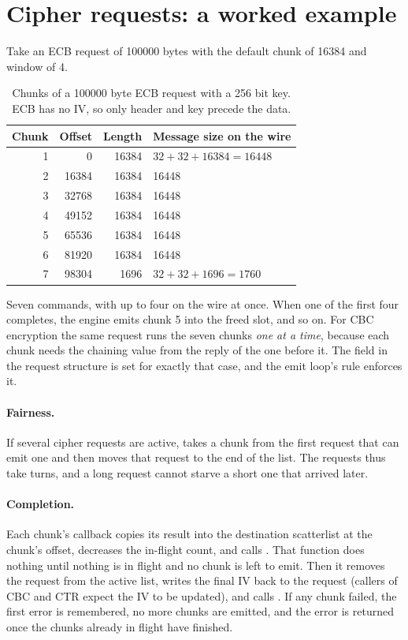 \section{Cipher requests: a worked example}

Take an ECB request of 100000 bytes with the default chunk of 16384 and window of 4.

\begin{table}[ht]
\centering
\begin{tabular}{rrrl}
\toprule
Chunk & Offset & Length & Message size on the wire \\
\midrule
1 & 0 & 16384 & $32 + 32 + 16384 = 16448$ \\
2 & 16384 & 16384 & 16448 \\
3 & 32768 & 16384 & 16448 \\
4 & 49152 & 16384 & 16448 \\
5 & 65536 & 16384 & 16448 \\
6 & 81920 & 16384 & 16448 \\
7 & 98304 & 1696 & $32 + 32 + 1696 = 1760$ \\
\bottomrule
\end{tabular}
\caption{Chunks of a 100000 byte ECB request with a 256 bit key. ECB has no IV, so only header and key precede the data.}
\end{table}

Seven commands, with up to four on the wire at once. When one of the first four completes, the engine emits chunk 5 into the freed slot, and so on. For CBC encryption the same request runs the seven chunks \emph{one at a time}, because each chunk needs the chaining value from the reply of the one before it. The field  in the request structure is set for exactly that case, and the emit loop's rule  enforces it.

\paragraph{Fairness.} If several cipher requests are active,  takes a chunk from the first request that can emit one and then moves that request to the end of the list. The requests thus take turns, and a long request cannot starve a short one that arrived later.

\paragraph{Completion.} Each chunk's callback copies its result into the destination scatterlist at the chunk's offset, decreases the in-flight count, and calls . That function does nothing until nothing is in flight and no chunk is left to emit. Then it removes the request from the active list, writes the final IV back to the request (callers of CBC and CTR expect the IV to be updated), and calls . If any chunk failed, the first error is remembered, no more chunks are emitted, and the error is returned once the chunks already in flight have finished.

